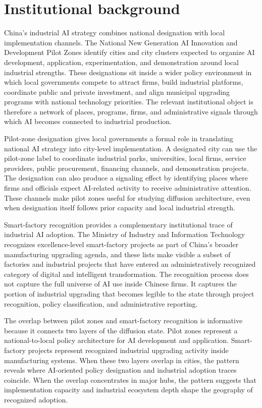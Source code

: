 \documentclass[12pt]{article}
\begin{document}
\section{Institutional background}
\label{sec:institutional}

China's industrial AI strategy combines national designation with local implementation channels. The National New Generation AI Innovation and Development Pilot Zones identify cities and city clusters expected to organize AI development, application, experimentation, and demonstration around local industrial strengths. These designations sit inside a wider policy environment in which local governments compete to attract firms, build industrial platforms, coordinate public and private investment, and align municipal upgrading programs with national technology priorities. The relevant institutional object is therefore a network of places, programs, firms, and administrative signals through which AI becomes connected to industrial production.

Pilot-zone designation gives local governments a formal role in translating national AI strategy into city-level implementation. A designated city can use the pilot-zone label to coordinate industrial parks, universities, local firms, service providers, public procurement, financing channels, and demonstration projects. The designation can also produce a signaling effect by identifying places where firms and officials expect AI-related activity to receive administrative attention. These channels make pilot zones useful for studying diffusion architecture, even when designation itself follows prior capacity and local industrial strength.

Smart-factory recognition provides a complementary institutional trace of industrial AI adoption. The Ministry of Industry and Information Technology recognizes excellence-level smart-factory projects as part of China's broader manufacturing upgrading agenda, and these lists make visible a subset of factories and industrial projects that have entered an administratively recognized category of digital and intelligent transformation. The recognition process does not capture the full universe of AI use inside Chinese firms. It captures the portion of industrial upgrading that becomes legible to the state through project recognition, policy classification, and administrative reporting.

The overlap between pilot zones and smart-factory recognition is informative because it connects two layers of the diffusion state. Pilot zones represent a national-to-local policy architecture for AI development and application. Smart-factory projects represent recognized industrial upgrading activity inside manufacturing systems. When these two layers overlap in cities, the pattern reveals where AI-oriented policy designation and industrial adoption traces coincide. When the overlap concentrates in major hubs, the pattern suggests that implementation capacity and industrial ecosystem depth shape the geography of recognized adoption.
\end{document}
